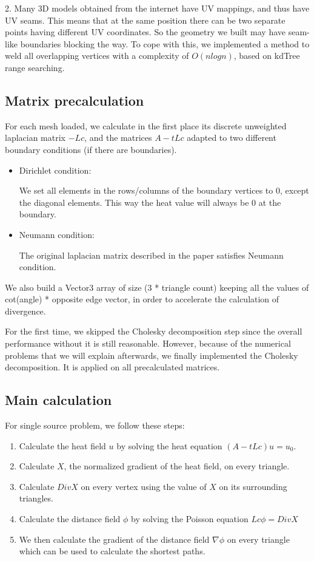 \documentclass[a4paper,12pt,twoside]{article}
\begin{document}
2. Many 3D models obtained from the internet have UV mappings, and thus have UV seams. This means that at the same position there can be two separate points having different UV coordinates. So the geometry we built may have seam-like boundaries blocking the way. To cope with this, we implemented a method to weld all overlapping vertices with a complexity of $O(nlogn)$, based on kdTree range searching.


\subsection{Matrix precalculation}

For each mesh loaded, we calculate in the first place its discrete unweighted laplacian matrix $-Lc$, and the matrices $A-tLc$ adapted to two different boundary conditions (if there are boundaries).

\begin{itemize}
\item
Dirichlet condition:

We set all elements in the rows/columns of the boundary vertices to 0, except the diagonal elements. This way the heat value will always be 0 at the boundary.

\item
Neumann condition:

The original laplacian matrix described in the paper satisfies Neumann condition.
\end{itemize}


We also build a Vector3 array of size (3 * triangle count) keeping all the values of cot(angle) * opposite edge vector, in order to accelerate the calculation of divergence.

For the first time, we skipped the Cholesky decomposition step since the overall performance without it is still reasonable. However, because of the numerical problems that we will explain afterwards, we finally implemented the Cholesky decomposition. It is applied on all precalculated matrices.

\subsection{Main calculation}

For single source problem, we follow these steps:

\begin{enumerate}
\item
Calculate the heat field $u$ by solving the heat equation $(A-tLc)u = u_0$.
\item
Calculate $X$, the normalized gradient of the heat field, on every triangle.
\item
Calculate $DivX$ on every vertex using the value of $X$ on its surrounding triangles.
\item
Calculate the distance field $\phi$ by solving the Poisson equation $Lc \phi = DivX$
\item
We then calculate the gradient of the distance field $\nabla \phi$ on every triangle which can be used to calculate the shortest paths.
\end{enumerate}
\end{document}
